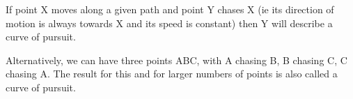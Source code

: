 If point X moves along a given path and point Y chases X (ie
its direction of motion is always towards X and its speed
is constant) then Y will describe a curve of pursuit.
\par
Alternatively, we can have three points ABC, with
A chasing B, B chasing C, C chasing A. The result for this and 
for larger numbers of points is also called a curve of pursuit.
